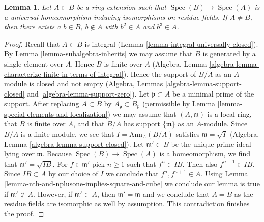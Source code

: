 \documentclass[10pt,a4paper]{amsart}
\theoremstyle{plain}
\newtheorem{lemma}[subsection]{Lemma}
\theoremstyle{definition}
\theoremstyle{remark}
\numberwithin{equation}{subsection}
\def\Spec{\mathop{\mathrm{Spec}}}
\begin{document}
\begin{lemma}
\label{lemma-square-and-cube}
Let $A \subset B$ be a ring extension such that $\Spec(B) \to \Spec(A)$
is a universal homeomorphism inducing isomorphisms on residue fields.
If $A \not = B$, then there exists a $b \in B$, $b \not \in A$ with
$b^2 \in A$ and $b^3 \in A$.
\end{lemma}

\begin{proof}
Recall that $A \subset B$ is integral
(Lemma \ref{lemma-integral-universally-closed}).
By Lemma \ref{lemma-subalgebra-inherits}
we may assume that $B$ is generated by a single element
over $A$. Hence $B$ is finite over $A$
(Algebra, Lemma \ref{algebra-lemma-characterize-finite-in-terms-of-integral}).
Hence the support of $B/A$ as an $A$-module is
closed and not empty (Algebra, Lemmas
\ref{algebra-lemma-support-closed} and \ref{algebra-lemma-support-zero}).
Let $\mathfrak p \subset A$ be a minimal prime
of the support. After replacing $A \subset B$ by
$A_\mathfrak p \subset B_\mathfrak p$ (permissible by
Lemma \ref{lemma-special-elements-and-localization})
we may assume that $(A, \mathfrak m)$ is a local ring,
that $B$ is finite over $A$, and that $B/A$ has support $\{\mathfrak m\}$
as an $A$-module. Since $B/A$ is a finite module,
we see that $I = \text{Ann}_A(B/A)$ satisfies $\mathfrak m = \sqrt{I}$
(Algebra, Lemma \ref{algebra-lemma-support-closed}).
Let $\mathfrak m' \subset B$ be the unique prime ideal lying over
$\mathfrak m$. Because $\Spec(B) \to \Spec(A)$ is a homeomorphism,
we find that $\mathfrak m' = \sqrt{IB}$.
For $f \in \mathfrak m'$ pick $n \geq 1$ such that
$f^n \in IB$. Then also $f^{n + 1} \in IB$.
Since $IB \subset A$ by our choice of $I$ we conclude that
$f^n, f^{n + 1} \in A$. Using
Lemma \ref{lemma-nth-and-nplusone-implies-square-and-cube}
we conclude our lemma is true if $\mathfrak m' \not \subset A$.
However, if $\mathfrak m' \subset A$, then $\mathfrak m' = \mathfrak m$
and we conclude that $A = B$ as the residue fields
are isomorphic as well by assumption. This contradiction
finishes the proof.
\end{proof}
\end{document}
